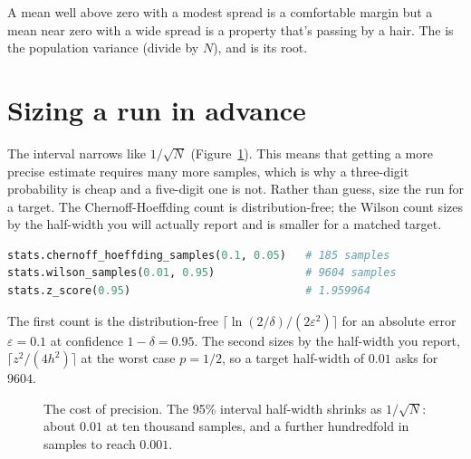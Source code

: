 A mean well above zero with a modest spread is a comfortable margin but a mean near zero with a wide spread is a property that's passing by a hair. The  is the population variance (divide by $N$), and  is its root.

\section{Sizing a run in advance}

The interval narrows like $1/\sqrt{N}$ (Figure~\ref{fig:halfwidth}). This means that getting a more precise estimate requires many more samples, which is why a three-digit probability is cheap and a five-digit one is not. Rather than guess, size the run for a target. The Chernoff-Hoeffding count is distribution-free; the Wilson count sizes by the half-width you will actually report and is smaller for a matched target.

\begin{lstlisting}[language=Python]
stats.chernoff_hoeffding_samples(0.1, 0.05)   # 185 samples
stats.wilson_samples(0.01, 0.95)              # 9604 samples
stats.z_score(0.95)                           # 1.959964
\end{lstlisting}

The first count is the distribution-free $\lceil \ln(2/\delta) / (2\varepsilon^2) \rceil$ for an absolute error $\varepsilon = 0.1$ at confidence $1-\delta = 0.95$. The second sizes by the half-width you report, $\lceil z^2 / (4h^2) \rceil$ at the worst case $p = 1/2$, so a target half-width of $0.01$ asks for $9604$.

\begin{figure}[h]
\centering
\begin{widefig}\end{widefig}
\caption{The cost of precision. The 95\% interval half-width shrinks as $1/\sqrt{N}$: about $0.01$ at ten thousand samples, and a further hundredfold in samples to reach $0.001$.}
\label{fig:halfwidth}
\end{figure}

